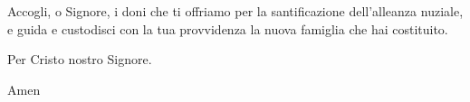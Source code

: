 \documentclass[11pt]{book}
\begin{document}
\benedizioneanelli[4]

\consegnaAnelli

\vspace{55pt}

%



\newpage


\introfedeli

\preghierefedeli

\pagebreak

\renewcommand{\personallitania}{
San Francesco d'Assisi, & \textbf{prega per noi}\\
Santa Vittoria, & \textbf{prega per noi}\\
}
\renewcommand{\litasposo}{San Nicolò, & \textbf{prega per noi}\\}
\renewcommand{\litasposa}{Santa Elisabetta, & \textbf{prega per noi}\\}
\renewcommand{\litachiesa}{
San Sebastiano, & \textbf{prega per noi}\\
Santo Stefano, & \textbf{prega per noi}\\
San Martino, & \textbf{prega per noi}\\
}
\introlitanie

\litanie

\newpage


\celebrante
{Accogli, o Signore, i doni che ti offriamo per la santificazione dell'alleanza nuziale,
e guida e custodisci con la tua provvidenza la nuova famiglia che hai costituito.

Per Cristo nostro Signore.}
{Amen}

\prefazio

\vspace{15pt}

\settowidth{\versewidth}{Benedetto colui che viene nel nome del Signore.}
\begin{canzone}[\versewidth]
\textbf{\santosanto}
\end{canzone}

\newpage
\pregheucar
\end{document}
